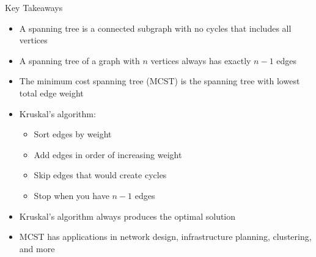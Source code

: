 \documentclass{beamer}
\begin{document}
\begin{frame}{Key Takeaways}
\begin{itemize}
\item A spanning tree is a connected subgraph with no cycles that includes all vertices
\item A spanning tree of a graph with $n$ vertices always has exactly $n-1$ edges
\item The minimum cost spanning tree (MCST) is the spanning tree with lowest total edge weight
\item Kruskal's algorithm:
  \begin{itemize}
  \item Sort edges by weight
  \item Add edges in order of increasing weight
  \item Skip edges that would create cycles
  \item Stop when you have $n-1$ edges
  \end{itemize}
\item Kruskal's algorithm always produces the optimal solution
\item MCST has applications in network design, infrastructure planning, clustering, and more
\end{itemize}
\end{frame}
\end{document}
